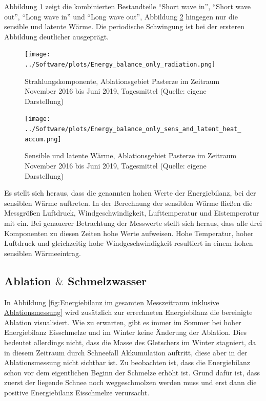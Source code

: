 \documentclass[11pt,a4paper]{article}
\begin{document}
Abbildung \ref{fig:Nettostrahlung (SW und LW) im gesamten Messzeitraum} zeigt die kombinierten Bestandteile ``Short wave in'', ``Short wave out'', ``Long wave in'' und ``Long wave out'', Abbildung \ref{fig:Sensible und latente Wärme im gesamten Messzeitraum} hingegen nur die sensible und latente Wärme. Die periodische Schwingung ist bei der ersteren Abbildung deutlicher ausgeprägt.

\begin{figure}[H]
\centering
\texttt{[image: ../Software/plots/Energy\_balance\_only\_radiation.png]}
\caption[Strahlungskomponente, Ablationsgebiet Pasterze im Zeitraum November 2016 bis Juni 2019, Tagesmittel]{Strahlungskomponente, Ablationsgebiet Pasterze im Zeitraum November 2016 bis Juni 2019, Tagesmittel (Quelle: eigene Darstellung)}
\label{fig:Nettostrahlung (SW und LW) im gesamten Messzeitraum}
\end{figure}

\begin{figure}[H]
\centering
\texttt{[image: ../Software/plots/Energy\_balance\_only\_sens\_and\_latent\_heat\_accum.png]}
\caption[Sensible und latente Wärme, Ablationsgebiet Pasterze im Zeitraum November 2016 bis Juni 2019, Tagesmittel]{Sensible und latente Wärme, Ablationsgebiet Pasterze im Zeitraum November 2016 bis Juni 2019, Tagesmittel (Quelle: eigene Darstellung)}
\label{fig:Sensible und latente Wärme im gesamten Messzeitraum}
\end{figure}

Es stellt sich heraus, dass die genannten hohen Werte der Energiebilanz, bei der sensiblen Wärme auftreten. In der Berechnung der sensiblen Wärme fließen die Messgrößen Luftdruck, Windgeschwindigkeit, Lufttemperatur und Eistemperatur mit ein. Bei genauerer Betrachtung der Messwerte stellt sich heraus, dass alle drei Komponenten zu diesen Zeiten hohe Werte aufweisen. Hohe Temperatur, hoher Luftdruck und gleichzeitig hohe Windgeschwindigkeit resultiert in einem hohen sensiblen Wärmeeintrag. 


\subsection{Ablation $\&$ Schmelzwasser}
In Abbildung \ref{fig:Energiebilanz im gesamten Messzeitraum inklusive Ablationsmessung} wird zusätzlich zur errechneten Energiebilanz die bereinigte Ablation visualisiert. Wie zu erwarten, gibt es immer im Sommer bei hoher Energiebilanz Eisschmelze und im Winter keine Änderung der Ablation. Dies bedeutet allerdings nicht, dass die Masse des Gletschers im Winter stagniert, da in diesem Zeitraum durch Schneefall Akkumulation auftritt, diese aber in der Ablationsmessung nicht sichtbar ist. Zu beobachten ist, dass die Energiebilanz schon vor dem eigentlichen Beginn der Schmelze erhöht ist. Grund dafür ist, dass zuerst der liegende Schnee noch weggeschmolzen werden muss und erst dann die positive Energiebilanz Eisschmelze verursacht.
\end{document}
